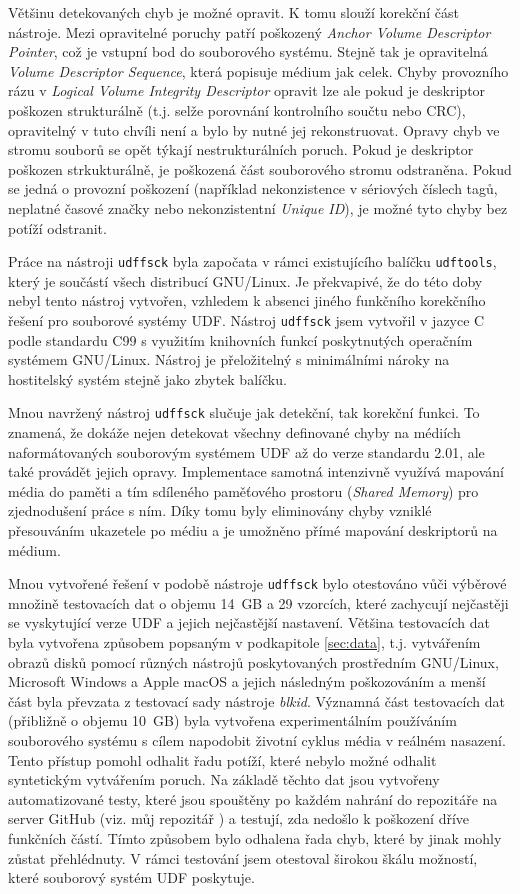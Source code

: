 Většinu detekovaných chyb je možné opravit. K tomu slouží korekční část nástroje. Mezi opravitelné poruchy patří poškozený \textit{Anchor Volume Descriptor Pointer}, což je vstupní bod do souborového systému. Stejně tak je opravitelná \textit{Volume Descriptor Sequence}, která popisuje médium jak celek. Chyby provozního rázu v \textit{Logical Volume Integrity Descriptor} opravit lze ale pokud je deskriptor poškozen strukturálně (t.j. selže porovnání kontrolního součtu nebo CRC), opravitelný v tuto chvíli není a bylo by nutné jej rekonstruovat. Opravy chyb ve stromu souborů se opět týkají nestrukturálních poruch. Pokud je deskriptor poškozen strkukturálně, je poškozená část souborového stromu odstraněna. Pokud se jedná o provozní poškození (například nekonzistence v sériových číslech tagů, neplatné časové značky nebo nekonzistentní \textit{Unique ID}), je možné tyto chyby bez potíží odstranit.

Práce na nástroji \texttt{udffsck} byla započata v rámci existujícího balíčku \texttt{udftools}, který je součástí všech distribucí GNU/Linux. Je překvapivé, že do této doby nebyl tento nástroj vytvořen, vzhledem k absenci jiného funkčního korekčního řešení pro souborové systémy UDF. Nástroj \texttt{udffsck} jsem vytvořil v jazyce C podle standardu C99 s využitím knihovních funkcí poskytnutých operačním systémem \mbox{GNU/Linux}. Nástroj je přeložitelný s minimálními nároky na hostitelský systém stejně jako zbytek balíčku. 

Mnou navržený nástroj \texttt{udffsck} slučuje jak detekční, tak korekční funkci. To znamená, že dokáže nejen detekovat všechny definované chyby na médiích naformátovaných souborovým systémem UDF až do verze standardu 2.01, ale také provádět jejich opravy. Implementace samotná intenzivně využívá mapování média do paměti a tím sdíleného paměťového prostoru (\textit{Shared Memory}) pro zjednodušení práce s ním. Díky tomu byly eliminovány chyby vzniklé přesouváním ukazetele po médiu a je umožněno přímé mapování deskriptorů na médium.

Mnou vytvořené řešení v podobě nástroje \texttt{udffsck} bylo otestováno vůči výběrové množině testovacích dat o objemu 14~GB a 29 vzorcích, které zachycují nejčastěji se vyskytující verze UDF a jejich nejčastější nastavení. Většina testovacích dat byla vytvořena způsobem popsaným v podkapitole \ref{sec:data}, t.j. vytvářením obrazů disků pomocí různých nástrojů poskytovaných prostředním \mbox{GNU/Linux}, Microsoft Windows a Apple macOS a jejich následným poškozováním a menší část byla převzata z testovací sady nástroje \textit{blkid}. Významná část testovacích dat (přibližně o objemu 10~GB) byla vytvořena experimentálním používáním souborového systému s cílem napodobit životní cyklus média v reálném nasazení. Tento přístup pomohl odhalit řadu potíží, které nebylo možné odhalit syntetickým vytvářením poruch. Na základě těchto dat jsou vytvořeny automatizované testy, které jsou spouštěny po každém nahrání do repozitáře na server GitHub (viz. můj repozitář \cite{udftools-github-moje}) a testují, zda nedošlo k poškození dříve funkčních částí. Tímto způsobem bylo odhalena řada chyb, které by jinak mohly zůstat přehlédnuty. V rámci testování jsem otestoval širokou škálu možností, které souborový systém UDF poskytuje.


